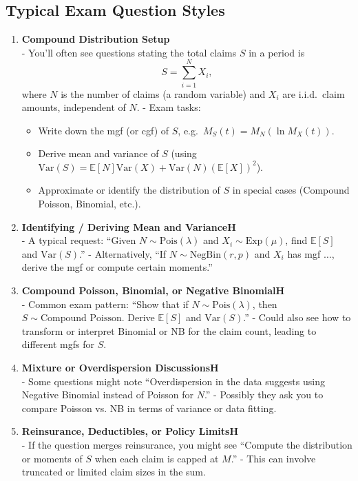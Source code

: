 \documentclass[13pt,a4paper]{article}
\begin{document}
\subsection{Typical Exam Question Styles}
\begin{enumerate}
  \item \textbf{Compound Distribution Setup}\\
    - You’ll often see questions stating the total claims \(S\) in a period is
      \[
        S = \sum_{i=1}^{N} X_i,
      \]
      where \(N\) is the number of claims (a random variable) and \(X_i\) are i.i.d.\ claim amounts, independent of \(N\).  
    - Exam tasks:
      \begin{itemize}
        \item Write down the mgf (or cgf) of \(S\), e.g.\ \(M_S(t)=M_N(\ln M_X(t))\).
        \item Derive mean and variance of \(S\) (using \(\mathrm{Var}(S)=\mathbb{E}[N]\mathrm{Var}(X)+\mathrm{Var}(N)(\mathbb{E}[X])^2\)).
        \item Approximate or identify the distribution of \(S\) in special cases (Compound Poisson, Binomial, etc.).
      \end{itemize}

  \item \textbf{Identifying / Deriving Mean and VarianceH}\\
    - A typical request: “Given \(N\sim \mathrm{Pois}(\lambda)\) and \(X_i \sim \mathrm{Exp}(\mu)\), find \(\mathbb{E}[S]\) and \(\mathrm{Var}(S)\).”  
    - Alternatively, “If \(N \sim \mathrm{NegBin}(r,p)\) and \(X_i\) has mgf \(\ldots\), derive the mgf or compute certain moments.”

  \item \textbf{Compound Poisson, Binomial, or Negative BinomialH}\\
    - Common exam pattern: “Show that if \(N\sim\mathrm{Pois}(\lambda)\), then \(S\sim\text{Compound Poisson}\). Derive \(\mathbb{E}[S]\) and \(\mathrm{Var}(S)\).”  
    - Could also see how to transform or interpret Binomial or NB for the claim count, leading to different mgfs for \(S\).

  \item \textbf{Mixture or Overdispersion DiscussionsH}\\
    - Some questions might note “Overdispersion in the data suggests using Negative Binomial instead of Poisson for \(N\).”  
    - Possibly they ask you to compare Poisson vs. NB in terms of variance or data fitting.

  \item \textbf{Reinsurance, Deductibles, or Policy LimitsH}\\
    - If the question merges reinsurance, you might see “Compute the distribution or moments of \(S\) when each claim is capped at \(M\).”
    - This can involve truncated or limited claim sizes in the sum.

\end{enumerate}
\end{document}
